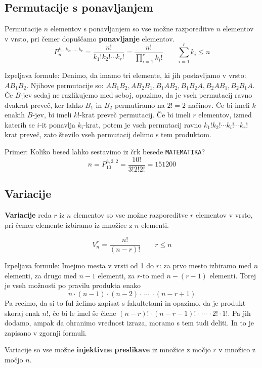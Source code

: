 \documentclass[a4paper,oneside,12pt,fleqn]{article}
\newcommand\krat\cdot
\numberwithin{equation}{section}
\begin{document}
\subsection{Permutacije s ponavljanjem}
\label{sec:komb:ppon}
Permutacije $n$ elementov s ponavljanjem so vse možne razporeditve $n$ elementov v vrsto,
pri čemer dopuščamo \textbf{ponavljanje} elementov.
\[ P_n^{k_1,k_2,\ldots,k_r} = \frac{n!}{k_1!k_2!\cdots k_r!} =
\frac{n!}{\displaystyle \prod_{i=1}^rk_i!} \qquad \sum_{i=1}^rk_i \le n \]

Izpeljava formule: Denimo, da imamo tri elemente, ki jih postavljamo v vrsto: $AB_1B_2$.
Njihove permutacije so: $AB_1B_2, AB_2B_1, B_1AB_2, B_1B_2A, B_2AB_1, B_2B_1A$.
Če $B$-jev sedaj ne razlikujemo med seboj, opazimo, da je vseh permutacij ravno dvakrat
preveč, ker lahko $B_1$ in $B_2$ permutiramo na $2! = 2$ načinov. Če bi imeli $k$ enakih
$B$-jev, bi imeli $k!$-krat preveč permutacij. Če bi imeli $r$
elementov, izmed katerih se $i$-it ponavlja $k_i$-krat, potem je vseh permutacij ravno
$k_1!k_2! \cdots k_i! \cdots k_r!$ krat preveč, zato število vseh permutacij delimo s tem
produktom.

Primer: Koliko besed lahko sestavimo iz črk besede \texttt{MATEMATIKA}?
\[ n = P_{10}^{3,2,2} = \frac{10!}{3!2!2!} = 151200 \]

\subsection{Variacije}
\label{sec:komb:var}

\textbf{Variacije} reda $r$ iz $n$ elementov so vse možne razporeditve $r$ elementov v
vrsto, pri čemer elemente izbiramo iz množice z $n$ elementi.

\[ V_n^r = \frac{n!}{(n-r)!} \qquad r \le n \]

Izpeljava formule: Imejmo mesta v vrsti od 1 do $r$:
za prvo mesto izbiramo med $n$ elementi, za drugo med $n-1$ elementi, za $r$-to med
$n-(r-1)$ elementi. Torej je vseh možnosti po pravilu produkta enako
\[ n \krat (n-1) \krat (n-2) \krat \, \cdots \, \krat (n-r+1) \]
Pa recimo, da si to ful želimo zapisat s fakultetami in opazimo, da je produkt skoraj enak
$n!$, če bi le imel še člene $(n-r)!\krat(n-r-1)! \krat \, \cdots \, \krat 2!\krat
1!$. Pa jih dodamo, ampak da ohranimo vrednost izraza, moramo s tem tudi deliti. In to je
zapisano v zgornji formuli.

Variacije so vse možne \textbf{injektivne preslikave} iz množice z močjo $r$ v množico z močjo
$n$.
\end{document}
